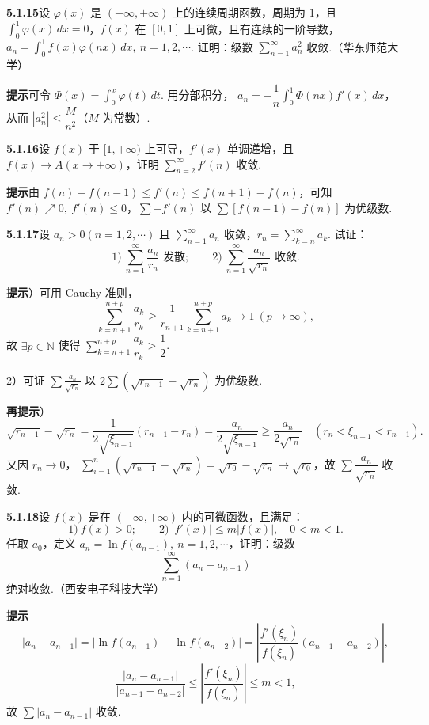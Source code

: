 \documentclass[UTF8, 12pt, fontset=fandol, oneside]{ctexart}
\begin{document}
\noindent\textbf{5.1.15}\quad 设 $\varphi(x)$ 是 $(-\infty,+\infty)$ 上的连续周期函数，周期为 $1$，且
$\displaystyle\int_0^1\varphi(x)\,dx=0$，$f(x)$ 在 $[0,1]$ 上可微，且有连续的一阶导数，
$a_n=\displaystyle\int_0^1f(x)\varphi(nx)\,dx,\ n=1,2,\cdots$. 证明：级数
$\displaystyle\sum_{n=1}^{\infty}a_n^2$ 收敛.（华东师范大学）

\noindent\textbf{提示}\quad 可令 $\Phi(x)=\displaystyle\int_0^x\varphi(t)\,dt$. 用分部积分，
$a_n=-\dfrac1n\displaystyle\int_0^1\Phi(nx)f'(x)\,dx$，从而
$|a_n^2|\le\dfrac{M}{n^2}$（$M$ 为常数）.

\noindent\textbf{5.1.16}\quad 设 $f(x)$ 于 $[1,+\infty)$ 上可导，$f'(x)$ 单调递增，且
$f(x)\to A(x\to+\infty)$，证明 $\displaystyle\sum_{n=2}^{\infty}f'(n)$ 收敛.

\noindent\textbf{提示}\quad 由 $f(n)-f(n-1)\le f'(n)\le f(n+1)-f(n)$，可知
$f'(n)\nearrow0,\ f'(n)\le0$，$\sum-f'(n)$ 以 $\sum[f(n-1)-f(n)]$ 为优级数.

\noindent\textbf{5.1.17}\quad 设 $a_n>0(n=1,2,\cdots)$ 且
$\displaystyle\sum_{n=1}^{\infty}a_n$ 收敛，$r_n=\displaystyle\sum_{k=n}^{\infty}a_k$. 试证：
\[
  1)\ \sum_{n=1}^{\infty}\frac{a_n}{r_n}\text{ 发散};\qquad
  2)\ \sum_{n=1}^{\infty}\frac{a_n}{\sqrt{r_n}}\text{ 收敛}.
\]

\noindent\textbf{提示}）可用 Cauchy 准则，
\[
  \sum_{k=n+1}^{n+p}\frac{a_k}{r_k}
  \ge \frac1{r_{n+1}}\sum_{k=n+1}^{n+p}a_k\to1\ (p\to\infty),
\]
故 $\exists p\in\mathbb N$ 使得 $\displaystyle\sum_{k=n+1}^{n+p}\dfrac{a_k}{r_k}\ge\dfrac12$.

2）可证 $\displaystyle\sum\frac{a_n}{\sqrt{r_n}}$ 以
$2\sum(\sqrt{r_{n-1}}-\sqrt{r_n})$ 为优级数.

\noindent\textbf{再提示}）
\[
  \sqrt{r_{n-1}}-\sqrt{r_n}
  =\frac1{2\sqrt{\xi_{n-1}}}(r_{n-1}-r_n)
  =\frac{a_n}{2\sqrt{\xi_{n-1}}}\ge\frac{a_n}{2\sqrt{r_n}}
  \quad(r_n<\xi_{n-1}<r_{n-1}).
\]
又因 $r_n\to0$，
$\sum_{i=1}^n(\sqrt{r_{n-1}}-\sqrt{r_n})=\sqrt{r_0}-\sqrt{r_n}\to\sqrt{r_0}$，故
$\sum\dfrac{a_n}{\sqrt{r_n}}$ 收敛.

\noindent\textbf{5.1.18}\quad 设 $f(x)$ 是在 $(-\infty,+\infty)$ 内的可微函数，且满足：
\[
  1)\ f(x)>0;\qquad 2)\ |f'(x)|\le m|f(x)|,\quad 0<m<1.
\]
任取 $a_0$，定义 $a_n=\ln f(a_{n-1}),\ n=1,2,\cdots$，证明：级数
\[
  \sum_{n=1}^{\infty}(a_n-a_{n-1})
\]
绝对收敛.（西安电子科技大学）

\noindent\textbf{提示}\quad
\[
  |a_n-a_{n-1}|
  =|\ln f(a_{n-1})-\ln f(a_{n-2})|
  =\left|\frac{f'(\xi_n)}{f(\xi_n)}(a_{n-1}-a_{n-2})\right|,
\]
\[
  \frac{|a_n-a_{n-1}|}{|a_{n-1}-a_{n-2}|}
  \le \left|\frac{f'(\xi_n)}{f(\xi_n)}\right|\le m<1,
\]
故 $\sum|a_n-a_{n-1}|$ 收敛.
\end{document}
